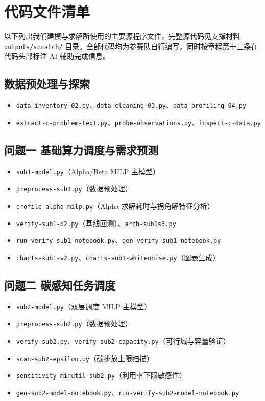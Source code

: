\section{代码文件清单}

\sloppy
以下列出我们建模与求解所使用的主要源程序文件，完整源代码见支撑材料 \texttt{outputs/scratch/} 目录。全部代码均为参赛队自行编写，同时按章程第十三条在代码头部标注 AI 辅助完成信息。

\subsection{数据预处理与探索}

\begin{itemize}
    \item \texttt{data-inventory-02.py}、\texttt{data-cleaning-03.py}、\texttt{data-profiling-04.py}
    \item \texttt{extract-c-problem-text.py}、\texttt{probe-observations.py}、\texttt{inspect-c-data.py}
\end{itemize}

\subsection{问题一 基础算力调度与需求预测}

\begin{itemize}
    \item \texttt{sub1-model.py}（Alpha/Beta MILP 主模型）
    \item \texttt{preprocess-sub1.py}（数据预处理）
    \item \texttt{profile-alpha-milp.py}（Alpha 求解耗时与拐角解特征分析）
    \item \texttt{verify-sub1-b2.py}（基线回测）、\texttt{arch-sub1s3.py}
    \item \texttt{run-verify-sub1-notebook.py}、\texttt{gen-verify-sub1-notebook.py}
    \item \texttt{charts-sub1-v2.py}、\texttt{charts-sub1-whitenoise.py}（图表生成）
\end{itemize}

\subsection{问题二 碳感知任务调度}

\begin{itemize}
    \item \texttt{sub2-model.py}（双层调度 MILP 主模型）
    \item \texttt{preprocess-sub2.py}（数据预处理）
    \item \texttt{verify-sub2.py}、\texttt{verify-sub2-capacity.py}（可行域与容量验证）
    \item \texttt{scan-sub2-epsilon.py}（碳排放上限扫描）
    \item \texttt{sensitivity-minutil-sub2.py}（利用率下限敏感性）
    \item \texttt{gen-sub2-model-notebook.py}、\texttt{run-verify-sub2-model-notebook.py}
\end{itemize}


